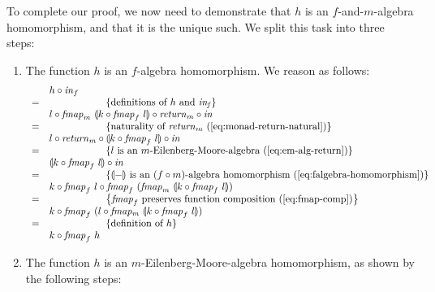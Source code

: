 \documentclass{jfp1}
\newcommand{\fold}[1]{\llparenthesis #1 \rrparenthesis}
\newcommand{\eqAnnotation}[1]{\hspace{2cm}\left\{\textrm{#1}\right\}}
\begin{document}
\begin{proof*}
  To complete our proof, we now need to demonstrate that $h$ is an
  $f$-and-$m$-algebra homomorphism, and that it is the unique such. We
  split this task into three steps:
  \begin{enumerate}
  \item The function $h$ is an $f$-algebra homomorphism. We reason as
    follows:
    \begin{displaymath}
      \begin{array}{cl}
        & h \circ \mathit{in}_f \\
        =&\eqAnnotation{definitions of $h$ and $\mathit{in_f}$} \\
         &l \circ \mathit{fmap}_m~\fold{k \circ \mathit{fmap}_f~l} \circ \mathit{return}_m \circ \mathit{in} \\
        =&\eqAnnotation{naturality of $\mathit{return}_m$ (\autoref{eq:monad-return-natural})} \\
         &l \circ \mathit{return}_m \circ \fold{k \circ \mathit{fmap}_f~l} \circ \mathit{in} \\
        =&\eqAnnotation{$l$ is an $m$-Eilenberg-Moore-algebra (\autoref{eq:em-alg-return})} \\
         &\fold{k \circ \mathit{fmap}_f~l} \circ \mathit{in} \\
        =&\eqAnnotation{$\fold{-}$ is an $(f \circ m)$-algebra homomorphism (\autoref{eq:falgebra-homomorphism})} \\
         &k \circ \mathit{fmap}_f~l \circ \mathit{fmap}_f~(\mathit{fmap}_m~\fold{k \circ \mathit{fmap}_f~l}) \\
        =&\eqAnnotation{$\mathit{fmap}_f$ preserves function composition (\autoref{eq:fmap-comp})} \\
         &k \circ \mathit{fmap}_f~(l \circ \mathit{fmap_m}~\fold{k \circ \mathit{fmap}_f~l}) \\
        =&\eqAnnotation{definition of $h$} \\
         & k \circ \mathit{fmap}_f~h
      \end{array}
    \end{displaymath}
  \item The function $h$ is an $m$-Eilenberg-Moore-algebra
    homomorphism, as shown by the following steps:
    \begin{displaymath}

\end{displaymath}
\end{enumerate}
\end{proof*}
\end{document}
